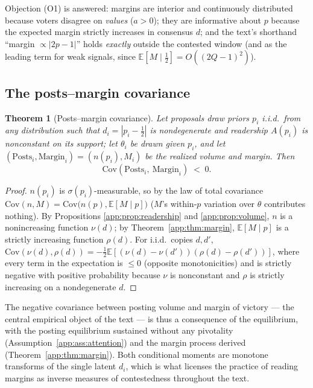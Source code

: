 \documentclass[12pt]{article}
\newtheorem{theorem}{Theorem}
\newcommand{\E}{\mathbb{E}}
\newcommand{\Cov}{\mathrm{Cov}}
\begin{document}
Objection (O1) is answered: margins are interior and continuously distributed
because voters disagree on \emph{values} ($a>0$); they are informative about
$p$ because the expected margin strictly increases in consensus $d$; and the text's shorthand ``margin $\propto|2p-1|$'' holds \emph{exactly} outside the
contested window (and as the leading term for weak signals, since
$\E[M\mid\tfrac12]=O((2Q-1)^2)$).

\subsection{The posts--margin covariance}
\label{app:sec:prop1}

\begin{theorem}[Posts--margin covariance]\label{app:thm:cov}
Let proposals draw priors $p_i$ i.i.d.\ from any distribution such that
$d_i=|p_i-\tfrac12|$ is nondegenerate and readership $A(p_i)$ is nonconstant on
its support; let $\theta_i$ be drawn given $p_i$, and let
$(\text{Posts}_i,\text{Margin}_i)=(n(p_i),M_i)$ be the realized volume and
margin. Then
\[
\Cov(\text{Posts}_i,\ \text{Margin}_i)\;<\;0 .
\]
\end{theorem}

\begin{proof}
$n(p_i)$ is $\sigma(p_i)$-measurable, so by the law of total covariance
$\Cov(n,M)=\Cov\bigl(n(p),\E[M\mid p]\bigr)$ ($M$'s within-$p$ variation over
$\theta$ contributes nothing). By Propositions \ref{app:prop:readership} and
\ref{app:prop:volume}, $n$ is a nonincreasing function $\nu(d)$; by
Theorem~\ref{app:thm:margin}, $\E[M\mid p]$ is a strictly increasing function
$\rho(d)$. For i.i.d.\ copies $d,d'$,
$\Cov(\nu(d),\rho(d))=-\tfrac12\E[(\nu(d)-\nu(d'))(\rho(d)-\rho(d'))]$, where
every term in the expectation is $\le0$ (opposite monotonicities) and is
strictly negative with positive probability because $\nu$ is nonconstant and
$\rho$ is strictly increasing on a nondegenerate $d$.
\end{proof}

The negative covariance between posting volume and margin of victory --- the central empirical object of the text --- is thus a consequence of the equilibrium, with the posting
equilibrium sustained without any pivotality (Assumption~\ref{app:ass:attention})
and the margin process derived (Theorem~\ref{app:thm:margin}). Both conditional
moments are monotone transforms of the single latent $d_i$, which is what licenses the practice of reading margins as inverse measures of contestedness throughout the text.
\end{document}
